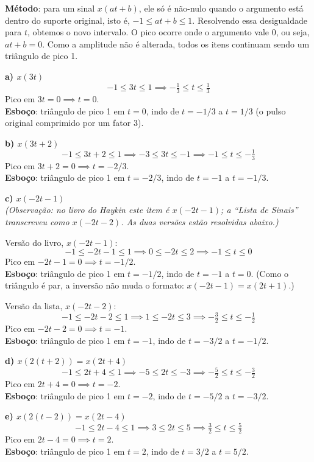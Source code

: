 \textbf{Método}: para um sinal \(x(at + b)\), ele só é não-nulo quando o argumento está dentro do suporte original, isto é, \(-1 \le at + b \le 1\). Resolvendo essa desigualdade para \(t\), obtemos o novo intervalo. O pico ocorre onde o argumento vale 0, ou seja, \(at + b = 0\). Como a amplitude não é alterada, todos os itens continuam sendo um triângulo de pico 1.

\textbf{a) \(x(3t)\)}
\[-1 \le 3t \le 1 \implies -\tfrac{1}{3} \le t \le \tfrac{1}{3}\]
Pico em \(3t = 0 \implies t = 0\).\\
\textbf{Esboço}: triângulo de pico 1 em \(t = 0\), indo de \(t = -1/3\) a \(t = 1/3\) (o pulso original comprimido por um fator 3).

\textbf{b) \(x(3t + 2)\)}
\[-1 \le 3t + 2 \le 1 \implies -3 \le 3t \le -1 \implies -1 \le t \le -\tfrac{1}{3}\]
Pico em \(3t + 2 = 0 \implies t = -2/3\).\\
\textbf{Esboço}: triângulo de pico 1 em \(t = -2/3\), indo de \(t = -1\) a \(t = -1/3\).

\textbf{c) \(x(-2t - 1)\)}\\
\emph{(Observação: no livro do Haykin este item é \(x(-2t-1)\); a ``Lista de Sinais'' transcreveu como \(x(-2t-2)\). As duas versões estão resolvidas abaixo.)}

Versão do livro, \(x(-2t - 1)\):
\[-1 \le -2t - 1 \le 1 \implies 0 \le -2t \le 2 \implies -1 \le t \le 0\]
Pico em \(-2t - 1 = 0 \implies t = -1/2\).\\
\textbf{Esboço}: triângulo de pico 1 em \(t = -1/2\), indo de \(t = -1\) a \(t = 0\). (Como o triângulo é par, a inversão não muda o formato: \(x(-2t-1) = x(2t+1)\).)

Versão da lista, \(x(-2t - 2)\):
\[-1 \le -2t - 2 \le 1 \implies 1 \le -2t \le 3 \implies -\tfrac{3}{2} \le t \le -\tfrac{1}{2}\]
Pico em \(-2t - 2 = 0 \implies t = -1\).\\
\textbf{Esboço}: triângulo de pico 1 em \(t = -1\), indo de \(t = -3/2\) a \(t = -1/2\).

\textbf{d) \(x(2(t + 2)) = x(2t + 4)\)}
\[-1 \le 2t + 4 \le 1 \implies -5 \le 2t \le -3 \implies -\tfrac{5}{2} \le t \le -\tfrac{3}{2}\]
Pico em \(2t + 4 = 0 \implies t = -2\).\\
\textbf{Esboço}: triângulo de pico 1 em \(t = -2\), indo de \(t = -5/2\) a \(t = -3/2\).

\textbf{e) \(x(2(t - 2)) = x(2t - 4)\)}
\[-1 \le 2t - 4 \le 1 \implies 3 \le 2t \le 5 \implies \tfrac{3}{2} \le t \le \tfrac{5}{2}\]
Pico em \(2t - 4 = 0 \implies t = 2\).\\
\textbf{Esboço}: triângulo de pico 1 em \(t = 2\), indo de \(t = 3/2\) a \(t = 5/2\).

